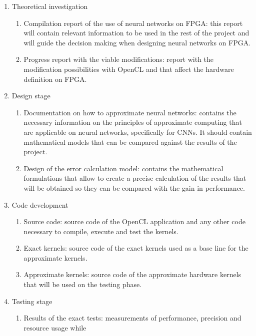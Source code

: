 \begin{enumerate}
    \item Theoretical investigation
        \begin{enumerate}
            \item Compilation report of the use of neural networks on FPGA: this report will contain
            relevant information to be used in the rest of the project and will guide the decision
            making when designing neural networks on FPGA. 
            \item Progress report with the viable modifications: report with the modification possibilities
            with OpenCL and that affect the hardware definition on FPGA.
        \end{enumerate}
    \item Design stage
        \begin{enumerate}
            \item Documentation on how to approximate neural networks: contains the necessary information
            on the principles of approximate computing that are applicable on neural networks, specifically
            for CNNs. It should contain mathematical models that can be compared against the results
            of the project.
            \item Design of the error calculation model: contains the mathematical formulations that allow
            to create a precise calculation of the results that will be obtained so they can be compared
            with the gain in performance.
        \end{enumerate}
    \item Code development
        \begin{enumerate}
            \item Source code: source code of the OpenCL application and any other code necessary to
            compile, execute and test the kernels.
            \item Exact kernels: source code of the exact kernels used as a base line for the approximate kernels.
            \item Approximate kernels: source code of the approximate hardware kernels that will be used
            on the testing phase.
        \end{enumerate}
    \item Testing stage
        \begin{enumerate}
            \item Results of the exact tests: measurements of performance, precision and resource usage while

\end{enumerate}
\end{enumerate}
